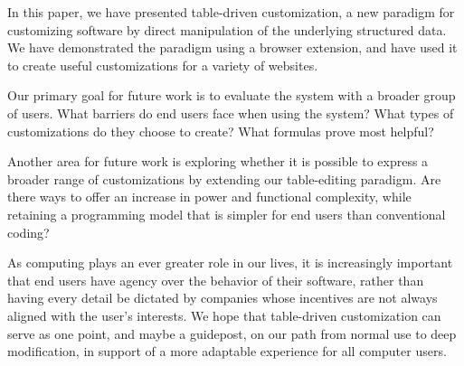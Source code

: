 \documentclass[sigplan,screen,10pt,anonymous,review]{acmart}
\begin{document}
In this paper, we have presented table-driven customization, a new
paradigm for customizing software by direct manipulation of the
underlying structured data. We have demonstrated the paradigm using a
browser extension, and have used it to create useful customizations for
a variety of websites.

Our primary goal for future work is to evaluate the system with a
broader group of users. What barriers do end users face when using the
system? What types of customizations do they choose to create? What
formulas prove most helpful?

Another area for future work is exploring whether it is possible to
express a broader range of customizations by extending our table-editing
paradigm. Are there ways to offer an increase in power and functional
complexity, while retaining a programming model that is simpler for end
users than conventional coding?

As computing plays an ever greater role in our lives, it is increasingly
important that end users have agency over the behavior of their
software, rather than having every detail be dictated by companies whose
incentives are not always aligned with the user's interests. We hope
that table-driven customization can serve as one point, and maybe a
guidepost, on our path from normal use to deep modification, in support
of a more adaptable experience for all computer users.



\end{document}
